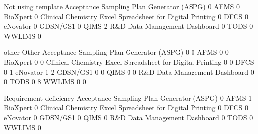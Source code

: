 \documentclass{article}
\begin{document}
\begin{Schunk}
\begin{Soutput}
                                                            Not using template
  Acceptance Sampling Plan Generator (ASPG)                                  0
  AFMS                                                                       0
  BioXpert                                                                   0
  Clinical Chemistry Excel Spreadsheet for Digital Printing                  0
  DFCS                                                                       0
  eNovator                                                                   0
  GDSN/GS1                                                                   0
  QIMS                                                                       2
  R&D Data Management Dashboard                                              0
  TODS                                                                       0
  WWLIMS                                                                     0
                                                           
                                                            other Other
  Acceptance Sampling Plan Generator (ASPG)                     0     0
  AFMS                                                          0     0
  BioXpert                                                      0     0
  Clinical Chemistry Excel Spreadsheet for Digital Printing     0     0
  DFCS                                                          0     1
  eNovator                                                      1     2
  GDSN/GS1                                                      0     0
  QIMS                                                          0     0
  R&D Data Management Dashboard                                 0     0
  TODS                                                          0     8
  WWLIMS                                                        0     0
                                                           
                                                            Requirement deficiency
  Acceptance Sampling Plan Generator (ASPG)                                      0
  AFMS                                                                           1
  BioXpert                                                                       0
  Clinical Chemistry Excel Spreadsheet for Digital Printing                      0
  DFCS                                                                           0
  eNovator                                                                       0
  GDSN/GS1                                                                       0
  QIMS                                                                           0
  R&D Data Management Dashboard                                                  0
  TODS                                                                           0
  WWLIMS                                                                         0
\end{Soutput}
\end{Schunk}
\end{document}
